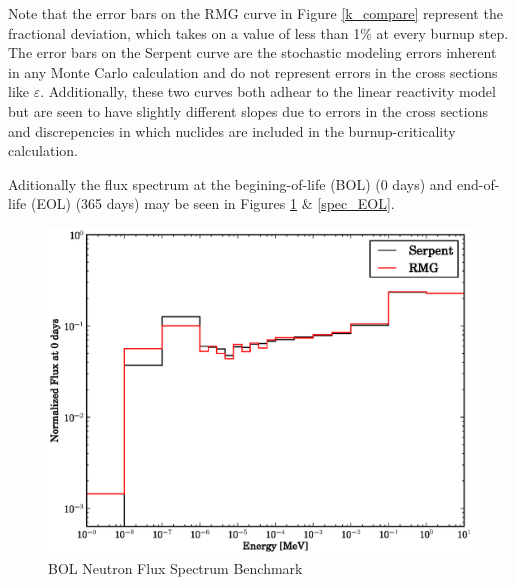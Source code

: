 Note that the error bars on the RMG curve in Figure \ref{k_compare} represent the fractional 
deviation, which takes on a value of less than 1\% at every burnup step.  
The error bars on the Serpent curve are the stochastic modeling errors inherent in any Monte
Carlo calculation and do not represent errors in the cross sections like $\varepsilon$.
Additionally, these two curves both adhear to the linear reactivity model but are seen to have slightly 
different slopes due to errors in the cross sections and discrepencies in which nuclides are included in 
the burnup-criticality calculation.

Aditionally the flux spectrum at the begining-of-life (BOL) (0 days) and end-of-life (EOL) (365 days)
may be seen in Figures \ref{spec_BOL} \& \ref{spec_EOL}.
\begin{figure}[htbp]
\caption{BOL Neutron Flux Spectrum Benchmark}
\label{spec_BOL}
\begin{center}
\includegraphics[scale=0.5]{multigroup_method/figs/benchmark/Normalized_Flux_at_0_days.eps}
\end{center}
\end{figure}
